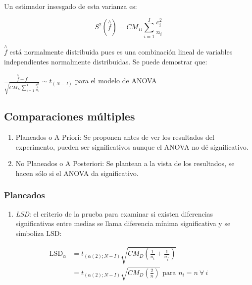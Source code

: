 \documentclass[]{book}
\providecommand{\tightlist}{%
  \setlength{\itemsep}{0pt}\setlength{\parskip}{0pt}}
\theoremstyle{definition}
\theoremstyle{definition}
\theoremstyle{definition}
\theoremstyle{remark}
\begin{document}
Un estimador insesgado de esta varianza es:

\[
S^{2}\left( \overset{\land}{f} \right) = CM_D\sum_{i = 1}^{I}\frac{c_{i}^{2}}{n_{i}}
\]

\(\overset{\land}{f}\) está normalmente distribuida pues es una
combinación lineal de variables independientes normalmente distribuidas.
Se puede demostrar que:

\(\frac{\overset{\land}{f} - f}{\sqrt{CM_D\sum_{i = 1}^{I}\frac{c_{i}^{2}}{n_{i}}}}\sim t_{\left( N - I \right)}\)
para el modelo de ANOVA

\hypertarget{comparaciones-multiples}{%
\subsection{Comparaciones múltiples}\label{comparaciones-multiples}}

\begin{enumerate}
\def\labelenumi{\arabic{enumi}.}
\item
  Planeados o A Priori: Se proponen antes de ver los resultados del
  experimento, pueden ser significativos aunque el ANOVA no dé
  significativo.
\item
  No Planeados o A Posteriori: Se plantean a la vista de los resultados,
  se hacen sólo si el ANOVA da significativo.
\end{enumerate}

\hypertarget{planeados}{%
\subsubsection{Planeados}\label{planeados}}

\begin{enumerate}
\def\labelenumi{\arabic{enumi})}
\tightlist
\item
  \emph{LSD}: el criterio de la prueba para examinar si existen
  diferencias significativas entre medias se llama diferencia mínima
  significativa y se simboliza \(\text{LSD}\):
\end{enumerate}

\[
\begin{aligned}
\text{LSD}_{\alpha}& = t_{\left( \alpha\left( 2 \right);N - I \right)}\sqrt{CM_D\left( \frac{1}{n_{i}} + \frac{1}{n_{i^{'}}} \right)} \\
& = t_{\left( \alpha\left( 2 \right);N - I \right)}\sqrt{CM_D\left( \frac{2}{n} \right)}\text{ para }n_{i} = n\ \forall\ i \\
\end{aligned}
\]
\end{document}
